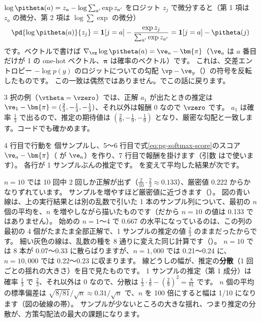 $\log\pitheta(a)=z_a-\log\sum_{a'}\exp z_{a'}$ をロジット $z_j$ で微分すると（第 1 項は $z_a$ の微分、第 2 項は $\log\sum\exp$ の微分）
\begin{equation}
\pd{\log\pitheta(a)}{z_j}=\mathbf{1}[j=a]-\frac{\exp z_j}{\sum_{a'}\exp z_{a'}}=\mathbf{1}[j=a]-\pitheta(j)
\label{eq:pg-softmax-score}
\end{equation}
です。ベクトルで書けば $\nabla_{\vz}\log\pitheta(a)=\ve_a-\bm{\pi}$（$\ve_a$ は $a$ 番目だけが 1 の one-hot ベクトル、$\bm{\pi}$ は確率のベクトル）です。
これは、交差エントロピー $-\log p(y)$ のロジットについての勾配 $\vp-\ve_y$（）の符号を反転したものです。
この一致は偶然ではありません。でこの話に戻ります。

3 択の例（$\vtheta=\vzero$）では、正解 $a_1$ が出たときの推定は $\ve_1-\bm{\pi}=(\frac23,-\frac13,-\frac13)$、それ以外は報酬 0 なので $\vzero$ です。
$a_1$ は確率 $\frac13$ で出るので、推定の期待値は $(\frac29,-\frac19,-\frac19)$ となり、厳密な勾配と一致します。コードでも確かめます。


4 行目で行動を  個サンプルし、5〜6 行目で式\eqref{eq:pg-softmax-score}のスコア $\ve_a-\bm{\pi}$（ が $\ve_a$）を作り、7 行目で報酬を掛けます（引数  はで使います）。
各行が 1 サンプルぶんの推定です。 を変えて平均した結果が次です。


$n=10$ では 10 回中 2 回しか正解が出ず（$\frac{2}{10}\cdot\frac23\approx0.133$）、厳密値 0.222 からかなりずれています。
サンプルを増やすほど厳密値に近づきます（）。
図の青い線は、上の実行結果とは別の乱数で引いた 1 本のサンプル列について、最初の $n$ 個の平均を、$n$ を増やしながら描いたものです（だから $n=10$ の値は 0.133 ではありません）。
始めの $n=1$〜4 で 0.667 の水平になっているのは、この列の最初の 4 個がたまたま全部正解で、1 サンプルの推定の値 $\frac23$ のままだったからです。
細い灰色の線は、乱数の種を 8 通りに変えた同じ計算です（）。
$n=10$ では 8 本が 0.07〜0.33 に散らばりますが、$n=1{,}000$ では 0.21〜0.24 に、$n=10{,}000$ では 0.22〜0.23 に収まります。
線どうしの幅が、推定の\textbf{分散}（1 回ごとの揺れの大きさ）を目で見たものです。
1 サンプルの推定（第 1 成分）は確率 $\frac13$ で $\frac23$、それ以外は 0 なので、分散は $\frac13\cdot\frac49-(\frac29)^2=\frac{8}{81}$ です。
$n$ 個の平均の標準偏差は $\sqrt{8/81}/\sqrt{n}\approx0.31/\sqrt{n}$ で、$n$ を 100 倍にすると幅は 1/10 になります（図の破線の帯）。
サンプルが少ないところの大きな揺れ、つまり推定の分散が、方策勾配法の最大の課題になります。

